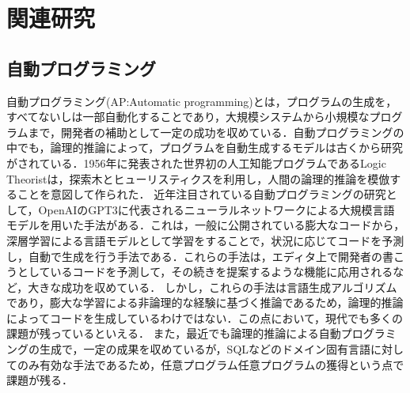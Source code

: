 \documentclass[exploratorypaper]{jsaiart} %
\begin{document}


\section{関連研究}
\subsection{自動プログラミング}
自動プログラミング(AP:Automatic programming)とは，プログラムの生成を，すべてないしは一部自動化することであり，大規模システムから小規模なプログラムまで，開発者の補助として一定の成功を収めている\cite{AutomaticProgramming}．自動プログラミングの中でも，論理的推論によって，プログラムを自動生成するモデルは古くから研究がされている．1956年に発表された世界初の人工知能プログラムであるLogic Theoristは，探索木とヒューリスティクスを利用し，人間の論理的推論を模倣することを意図して作られた\cite{LogicTheorist}．
近年注目されている自動プログラミングの研究として，OpenAIのGPT3\cite{gpt3}に代表されるニューラルネットワークによる大規模言語モデルを用いた手法がある．これは，一般に公開されている膨大なコードから，深層学習による言語モデルとして学習をすることで，状況に応じてコードを予測し，自動で生成を行う手法である．これらの手法は，エディタ上で開発者の書こうとしているコードを予測して，その続きを提案するような機能に応用されるなど，大きな成功を収めている\cite{copilot}．
しかし，これらの手法は言語生成アルゴリズムであり，膨大な学習による非論理的な経験に基づく推論であるため，論理的推論によってコードを生成しているわけではない．この点において，現代でも多くの課題が残っているといえる．
また，最近でも論理的推論による自動プログラミングの生成で，一定の成果を収めているが\cite{palsql}，SQLなどのドメイン固有言語に対してのみ有効な手法であるため，任意プログラム任意プログラムの獲得という点で課題が残る．

\end{document}
